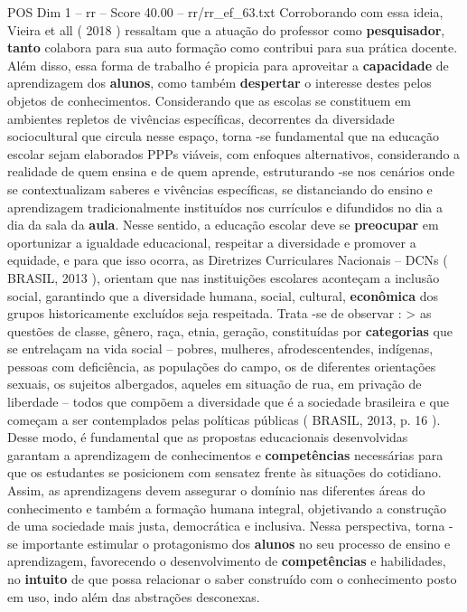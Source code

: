 \begin{textsample}{POS Dim 1 – rr – Score 40.00 – rr/rr\_ef\_63.txt}
Corroborando com essa ideia, Vieira et all ( 2018 ) ressaltam que a atuação do professor como \textbf{pesquisador}, \textbf{tanto} colabora para sua auto formação como contribui para sua prática docente.
Além disso, essa forma de trabalho é propicia para aproveitar a \textbf{capacidade} de aprendizagem dos \textbf{alunos}, como também \textbf{despertar} o interesse destes pelos objetos de conhecimentos.
Considerando que as escolas se constituem em ambientes repletos de vivências específicas, decorrentes da diversidade sociocultural que circula nesse espaço, torna -se fundamental que na educação escolar sejam elaborados PPPs viáveis, com enfoques alternativos, considerando a realidade de quem ensina e de quem aprende, estruturando -se nos cenários onde se contextualizam saberes e vivências específicas, se distanciando do ensino e aprendizagem tradicionalmente instituídos nos currículos e difundidos no dia a dia da sala da \textbf{aula}.
Nesse sentido, a educação escolar deve se \textbf{preocupar} em oportunizar a igualdade educacional, respeitar a diversidade e promover a equidade, e para que isso ocorra, as Diretrizes Curriculares Nacionais – DCNs ( BRASIL, 2013 ), orientam que nas instituições escolares aconteçam a inclusão social, garantindo que a diversidade humana, social, cultural, \textbf{econômica} dos grupos historicamente excluídos seja respeitada.
Trata -se de observar : > as questões de classe, gênero, raça, etnia, geração, constituídas por \textbf{categorias} que se entrelaçam na vida social – pobres, mulheres, afrodescentendes, indígenas, pessoas com deficiência, as populações do campo, os de diferentes orientações sexuais, os sujeitos albergados, aqueles em situação de rua, em privação de liberdade – todos que compõem a diversidade que é a sociedade brasileira e que começam a ser contemplados pelas políticas públicas ( BRASIL, 2013, p. 16 ).
Desse modo, é fundamental que as propostas educacionais desenvolvidas garantam a aprendizagem de conhecimentos e \textbf{competências} necessárias para que os estudantes se posicionem com sensatez frente às situações do cotidiano.
Assim, as aprendizagens devem assegurar o domínio nas diferentes áreas do conhecimento e também a formação humana integral, objetivando a construção de uma sociedade mais justa, democrática e inclusiva.
Nessa perspectiva, torna -se importante estimular o protagonismo dos \textbf{alunos} no seu processo de ensino e aprendizagem, favorecendo o desenvolvimento de \textbf{competências} e habilidades, no \textbf{intuito} de que possa relacionar o saber construído com o conhecimento posto em uso, indo além das abstrações desconexas.

\end{textsample}
